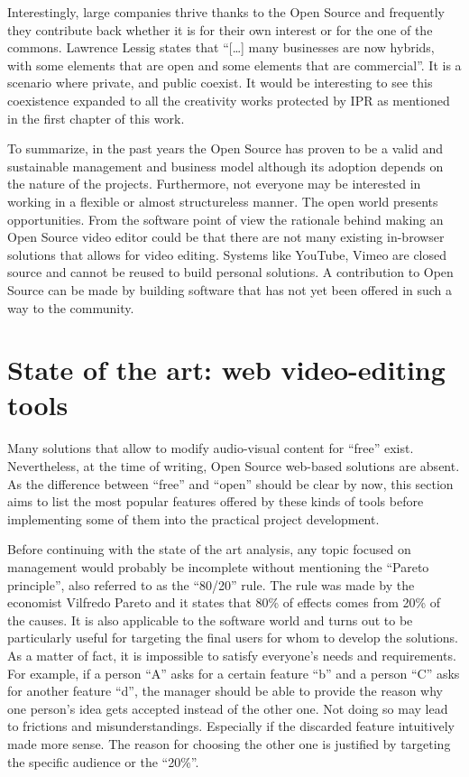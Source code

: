 Interestingly, large companies thrive thanks to the Open Source and frequently they contribute back whether it is for their own interest or for the one of the commons. Lawrence Lessig states that “[…] many businesses are now hybrids, with some elements that are open and some elements that are commercial”. It is a scenario where private, and public coexist. It would be interesting to see this coexistence expanded to all the creativity works protected by IPR as mentioned in the first chapter of this work.

To summarize, in the past years the Open Source has proven to be a valid and sustainable management and business model although its adoption depends on the nature of the projects. Furthermore, not everyone may be interested in working in a flexible or almost structureless manner.
The open world presents opportunities. From the software point of view the rationale behind making an Open Source video editor could be that there are not many existing in-browser solutions that allows for video editing. Systems like YouTube, Vimeo are closed source and cannot be reused to build personal solutions. A contribution to Open Source can be made by building software that has not yet been offered in such a way to the community.

\section{State of the art: web video-editing tools}
\label{sec:stateOfArt}

Many solutions that allow to modify audio-visual content for “free” exist. Nevertheless, at the time of writing, Open Source web-based solutions are absent. As the difference between “free” and “open” should be clear by now, this section aims to list the most popular features offered by these kinds of tools before implementing some of them into the practical project development.

Before continuing with the state of the art analysis, any topic focused on management would probably be incomplete without mentioning the “Pareto principle”, also referred to as the “80/20” rule. The rule was made by the economist Vilfredo Pareto and it states that 80\% of effects comes from 20\% of the causes. It is also applicable to the software world and turns out to be particularly useful for targeting the final users for whom to develop the solutions. As a matter of fact, it is impossible to satisfy everyone’s needs and requirements. For example, if a person “A” asks for a certain feature “b” and a person “C” asks for another feature “d”, the manager should be able to provide the reason why one person’s idea gets accepted instead of the other one. Not doing so may lead to frictions and misunderstandings. Especially if the discarded feature intuitively made more sense. The reason for choosing the other one is justified by targeting the specific audience or the “20\%”.

